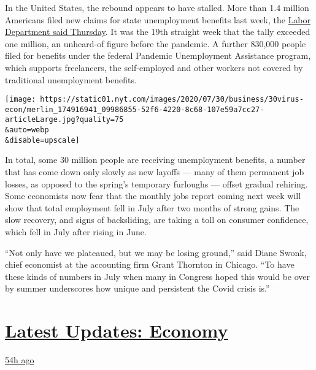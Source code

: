 In the United States, the rebound appears to have stalled. More than 1.4
million Americans filed new claims for state unemployment benefits last
week, the \href{https://oui.doleta.gov/press/2020/073020.pdf}{Labor
Department said Thursday}. It was the 19th straight week that the tally
exceeded one million, an unheard-of figure before the pandemic. A
further 830,000 people filed for benefits under the federal Pandemic
Unemployment Assistance program, which supports freelancers, the
self-employed and other workers not covered by traditional unemployment
benefits.

\texttt{[image: https://static01.nyt.com/images/2020/07/30/business/30virus-econ/merlin\_174916941\_09986855-52f6-4220-8c68-107e59a7cc27-articleLarge.jpg?quality=75\\\&auto=webp\\\&disable=upscale]}

In total, some 30 million people are receiving unemployment benefits, a
number that has come down only slowly as new layoffs --- many of them
permanent job losses, as opposed to the spring's temporary furloughs ---
offset gradual rehiring. Some economists now fear that the monthly jobs
report coming next week will show that total employment fell in July
after two months of strong gains. The slow recovery, and signs of
backsliding, are taking a toll on consumer confidence, which fell in
July after rising in June.

``Not only have we plateaued, but we may be losing ground,'' said Diane
Swonk, chief economist at the accounting firm Grant Thornton in Chicago.
``To have these kinds of numbers in July when many in Congress hoped
this would be over by summer underscores how unique and persistent the
Covid crisis is.''

\hypertarget{latest-updates-economy}{%
\section{\texorpdfstring{\href{https://www.nytimes.com/live/2020/07/31/business/stock-market-today-coronavirus?action=click\&pgtype=Article\&state=default\&region=MAIN_CONTENT_1\&context=storylines_live_updates}{Latest
Updates:
Economy}}{Latest Updates: Economy}}\label{latest-updates-economy}}

\href{https://www.nytimes.com/live/2020/07/31/business/stock-market-today-coronavirus?action=click\&pgtype=Article\&state=default\&region=MAIN_CONTENT_1\&context=storylines_live_updates\#kodaks-chief-executive-was-given-stock-options-then-the-share-price-spiked-1000-percent}{54h
ago}

